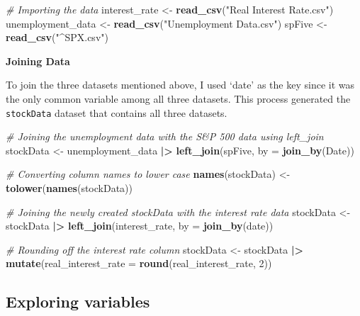 \documentclass[
]{article}
\newenvironment{Shaded}{\begin{snugshade}}{\end{snugshade}}
\newcommand{\AttributeTok}[1]{\textcolor[rgb]{0.13,0.29,0.53}{#1}}
\newcommand{\CommentTok}[1]{\textcolor[rgb]{0.56,0.35,0.01}{\textit{#1}}}
\newcommand{\DecValTok}[1]{\textcolor[rgb]{0.00,0.00,0.81}{#1}}
\newcommand{\FunctionTok}[1]{\textcolor[rgb]{0.13,0.29,0.53}{\textbf{#1}}}
\newcommand{\NormalTok}[1]{#1}
\newcommand{\OtherTok}[1]{\textcolor[rgb]{0.56,0.35,0.01}{#1}}
\newcommand{\SpecialCharTok}[1]{\textcolor[rgb]{0.81,0.36,0.00}{\textbf{#1}}}
\newcommand{\StringTok}[1]{\textcolor[rgb]{0.31,0.60,0.02}{#1}}
\begin{document}
\begin{Shaded}
\begin{Highlighting}[]
\CommentTok{\# Importing the data}
\NormalTok{interest\_rate }\OtherTok{\textless{}{-}} \FunctionTok{read\_csv}\NormalTok{(}\StringTok{"Real Interest Rate.csv"}\NormalTok{)}
\NormalTok{unemployment\_data }\OtherTok{\textless{}{-}} \FunctionTok{read\_csv}\NormalTok{(}\StringTok{"Unemployment Data.csv"}\NormalTok{)}
\NormalTok{spFive }\OtherTok{\textless{}{-}} \FunctionTok{read\_csv}\NormalTok{(}\StringTok{"\^{}SPX.csv"}\NormalTok{)}
\end{Highlighting}
\end{Shaded}

\textbf{Joining Data}

To join the three datasets mentioned above, I used `date' as the key
since it was the only common variable among all three datasets. This
process generated the \texttt{stockData} dataset that contains all three
datasets.

\begin{Shaded}
\begin{Highlighting}[]
\CommentTok{\# Joining the unemployment data with the S\&P 500 data using left\_join}
\NormalTok{stockData }\OtherTok{\textless{}{-}}\NormalTok{ unemployment\_data }\SpecialCharTok{|\textgreater{}}
  \FunctionTok{left\_join}\NormalTok{(spFive, }\AttributeTok{by =} \FunctionTok{join\_by}\NormalTok{(Date))}

\CommentTok{\# Converting column names to lower case}
\FunctionTok{names}\NormalTok{(stockData) }\OtherTok{\textless{}{-}} \FunctionTok{tolower}\NormalTok{(}\FunctionTok{names}\NormalTok{(stockData))}

\CommentTok{\# Joining the newly created \textasciigrave{}stockData\textasciigrave{} with the interest rate data}
\NormalTok{stockData }\OtherTok{\textless{}{-}}\NormalTok{ stockData }\SpecialCharTok{|\textgreater{}}
  \FunctionTok{left\_join}\NormalTok{(interest\_rate, }\AttributeTok{by =} \FunctionTok{join\_by}\NormalTok{(date))}

\CommentTok{\# Rounding off the interest rate column}
\NormalTok{stockData }\OtherTok{\textless{}{-}}\NormalTok{ stockData }\SpecialCharTok{|\textgreater{}}
  \FunctionTok{mutate}\NormalTok{(}\AttributeTok{real\_interest\_rate =} \FunctionTok{round}\NormalTok{(real\_interest\_rate, }\DecValTok{2}\NormalTok{))}
\end{Highlighting}
\end{Shaded}

\hypertarget{exploring-variables}{%
\subsection{Exploring variables}\label{exploring-variables}}
\end{document}
